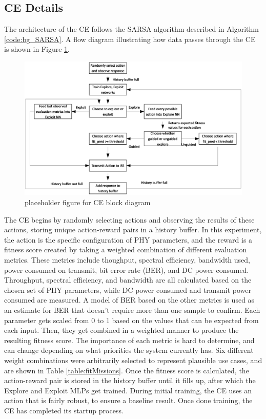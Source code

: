 \subsection{CE Details}
\par The architecture of the CE follows the SARSA algorithm described in Algorithm \ref{code:bg_SARSA}. A flow diagram illustrating how data passes through the CE is shown in Figure \ref{fig:ceDataFlow}. 
\begin{figure}[ht]
\includegraphics[width=\textwidth]{figures/rough_flow_diagram.eps}
\caption{placeholder figure for CE block diagram}\label{fig:ceDataFlow}
\end{figure}
\par The CE begins by randomly selecting actions and observing the results of these actions, storing unique action-reward pairs in a history buffer. In this experiment, the action is the specific configuration of PHY parameters, and the reward is a fitness score created by taking a weighted combination of different evaluation metrics. These metrics include thoughput, spectral efficiency, bandwidth used, power consumed on transmit, bit error rate (BER), and DC power consumed. Throughput, spectral efficiency, and bandwidth are all calculated based on the chosen set of PHY parameters, while DC power consumed and transmit power consumed are measured. A model of BER based on the other metrics is used as an estimate for BER that doesn't require more than one sample to confirm. Each parameter gets scaled from 0 to 1 based on the values that can be expected from each input. Then, they get combined in a weighted manner to produce the resulting fitness score. The importance of each metric is hard to determine, and can change depending on what priorities the system currently has. Six different weight combinations were arbitrarily selected to represent plausible use cases, and are shown in Table \ref{table:fitMissions}. Once the fitness score is calculated, the action-reward pair is stored in the history buffer until it fills up, after which the Explore and Exploit MLPs get trained. During initial training, the CE uses an action that is fairly robust, to ensure a baseline result. Once done training, the CE has completed its startup process.
